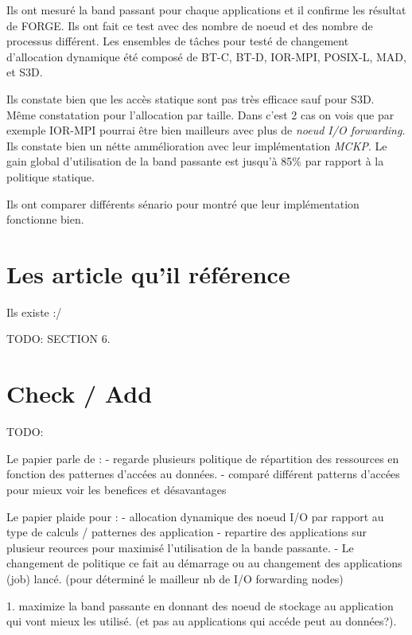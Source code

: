 \documentclass[10pt, a4paper]{article}
\begin{document}
Ils ont mesuré la band passant pour chaque applications et il confirme les résultat de FORGE. Ils ont fait ce test avec des nombre de noeud et des nombre de processus différent.
Les ensembles de tâches pour testé de changement d'allocation dynamique été composé de BT-C, BT-D, IOR-MPI, POSIX-L, MAD, et S3D.

Ils constate bien que les accès statique sont pas très efficace sauf pour S3D. Même constatation pour l'allocation par taille. Dans c'est 2 cas on vois que par exemple IOR-MPI pourrai être bien mailleurs avec plus de \emph{noeud I/O forwarding}. Ils constate bien un nétte ammélioration avec leur implémentation \emph{MCKP}. Le gain global d'utilisation de la band passante est jusqu'à 85\% par rapport à la politique statique.

Ils ont comparer différents sénario pour montré que leur implémentation fonctionne bien.

\section{Les article qu'il référence}

Ils existe :/

TODO: SECTION 6.

\section{Check / Add}

TODO:

Le papier parle de :
- regarde plusieurs politique de répartition des ressources en fonction des patternes d'accées au données.
- comparé différent patterns d'accées pour mieux voir les benefices et désavantages

Le papier plaide pour :
- allocation dynamique des noeud I/O par rapport au type de calculs / patternes des application
- repartire des applications sur plusieur reources pour maximisé l'utilisation de la bande passante.
- Le changement de politique ce fait au démarrage ou au changement des applications (job) lancé. (pour déterminé le mailleur nb de I/O forwarding nodes)

1. maximize la band passante en donnant des noeud de stockage au application qui vont mieux les utilisé. (et pas au applications qui accéde peut au données?).


\nocite{*}
\end{document}
